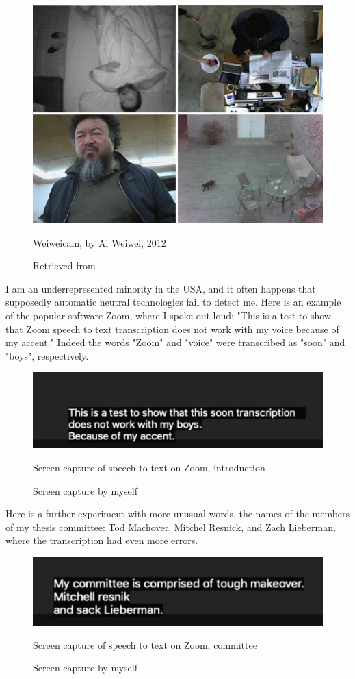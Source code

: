 \begin{figure}[ht]
  \centering
  \includegraphics[width=0.75\linewidth,height=0.30\textheight,keepaspectratio]{images/weiweicam.jpg}
  \caption{Weiweicam, by Ai Weiwei, 2012}
  \caption*{Retrieved from \cite{website-forbes-ai-weiwei-cam}}
  \label{fig:weiweicam}
\end{figure}

I am an underrepresented minority in the USA, and it often happens that supposedly automatic neutral technologies fail to detect me. Here is an example of the popular software Zoom, where I spoke out loud: "This is a test to show that Zoom speech to text transcription does not work with my voice because of my accent." Indeed the words "Zoom" and "voice" were transcribed as "soon" and "boys", respectively.

\begin{figure}[ht]
  \centering
  \includegraphics[width=0.75\linewidth,height=0.25\textheight,keepaspectratio]{images/zoom-introduction.jpg}
  \caption{Screen capture of speech-to-text on Zoom, introduction}
  \caption*{Screen capture by myself}
  \label{fig:zoom-voice}
\end{figure}

Here is a further experiment with more unusual words, the names of the members of my thesis committee: Tod Machover, Mitchel Resnick, and Zach Lieberman, where the transcription had even more errors.

\begin{figure}[ht]
  \centering
  \includegraphics[width=0.75\linewidth,height=0.25\textheight,keepaspectratio]{images/zoom-committee.jpg}
  \caption{Screen capture of speech to text on Zoom, committee}
  \caption*{Screen capture by myself}
  \label{fig:zoom-committee}
\end{figure}

